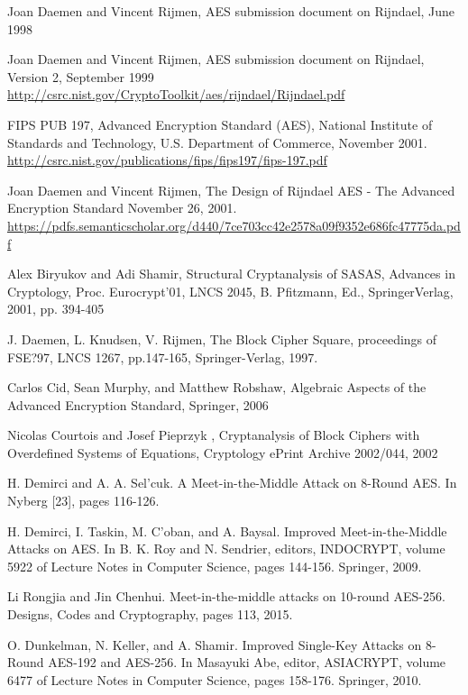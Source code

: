 \documentclass[twoside]{article}
\begin{document}
\begin{thebibliography}{99} 

Joan Daemen and Vincent Rijmen, AES submission document on Rijndael, June 1998

Joan Daemen and Vincent Rijmen, AES submission document on Rijndael, Version 2, September 1999
\newblock \url{http://csrc.nist.gov/CryptoToolkit/aes/rijndael/Rijndael.pdf}

FIPS PUB 197, Advanced Encryption Standard (AES), National Institute of Standards and Technology, U.S. Department of Commerce, November 2001.
\newblock \url{http://csrc.nist.gov/publications/fips/fips197/fips-197.pdf}

Joan Daemen and Vincent Rijmen, The Design of Rijndael AES - The Advanced Encryption Standard November 26, 2001.
\newblock \url{https://pdfs.semanticscholar.org/d440/7ce703cc42e2578a09f9352e686fc47775da.pdf}

Alex Biryukov and Adi Shamir, Structural Cryptanalysis of SASAS, Advances in Cryptology, Proc. Eurocrypt'01, LNCS 2045, B. Pfitzmann, Ed., SpringerVerlag, 2001, pp. 394-405

J. Daemen, L. Knudsen, V. Rijmen, The Block Cipher Square, proceedings of FSE?97, LNCS 1267, pp.147-165, Springer-Verlag, 1997.

Carlos Cid, Sean Murphy, and Matthew Robshaw, Algebraic Aspects of the Advanced Encryption Standard, Springer, 2006

Nicolas Courtois and Josef Pieprzyk , Cryptanalysis of Block Ciphers with Overdefined Systems of Equations, Cryptology ePrint Archive 2002/044, 2002

H. Demirci and A. A. Sel'cuk. A Meet-in-the-Middle Attack on 8-Round AES. In Nyberg [23], pages 116-126.

H. Demirci, I. Taskin, M. C'oban, and A. Baysal. Improved Meet-in-the-Middle Attacks on AES. In B. K. Roy and N. Sendrier, editors, INDOCRYPT, volume 5922 of Lecture Notes in Computer Science, pages 144-156. Springer, 2009.

Li Rongjia and Jin Chenhui. Meet-in-the-middle attacks on 10-round AES-256. Designs, Codes and Cryptography, pages 113, 2015.

O. Dunkelman, N. Keller, and A. Shamir. Improved Single-Key Attacks on 8- Round AES-192 and AES-256. In Masayuki Abe, editor, ASIACRYPT, volume 6477 of Lecture Notes in Computer Science, pages 158-176. Springer, 2010.


\end{thebibliography}
\end{document}
